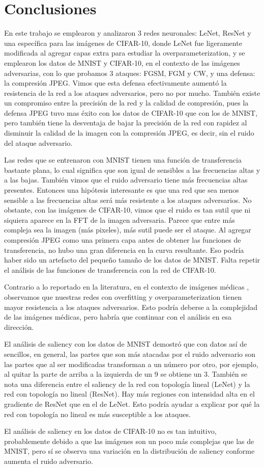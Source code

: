 \section{Conclusiones}
En este trabajo se emplearon y analizaron 3 redes neuronales: LeNet, ResNet y una específica para las imágenes de CIFAR-10, donde LeNet fue ligeramente modificada al agregar capas extra para estudiar la overparameterization, y se emplearon los datos de MNIST y CIFAR-10, en el contexto de las imágenes adversarias, con lo que probamos 3 ataques: FGSM, FGM y CW, y una defensa: la compresión JPEG. Vimos que esta defensa efectivamente aumentó la resistencia de la red a los ataques adversarios, pero no por mucho. También existe un compromiso entre la precisión de la red y la calidad de compresión, pues la defensa JPEG tuvo mas éxito con los datos de CIFAR-10 que con los de MNIST, pero también tiene la desventaja de bajar la precisión de la red con rapidez al disminuir la calidad de la imagen con la compresión JPEG, es decir, sin el ruido del ataque adversario.

Las redes que se entrenaron con MNIST tienen una función de transferencia bastante plana, lo cual significa que son igual de sensibles a las frecuencias altas y a las bajas. También vimos que el ruido adversario tiene más frecuencias altas presentes. Entonces una hipótesis interesante es que una red que sea menos sensible a las frecuencias altas será más resistente a los ataques adversarios. No obstante, con las imágenes de CIFAR-10, vimos que el ruido es tan sutil que ni siquiera aparece en la FFT de la imagen adversaria. Parece que entre más compleja sea la imagen (más pixeles), más sutil puede ser el ataque. Al agregar compresión JPEG como una primera capa antes de obtener las funciones de transferencia, no hubo una gran diferencia en la curva resultante. Eso podría haber sido un artefacto del pequeño tamaño de los datos de MNIST. Falta repetir el análisis de las funciones de transferencia con la red de CIFAR-10.

Contrario a lo reportado en la literatura, en el contexto de imágenes médicas \cite{ma2020understanding}, observamos que nuestras redes con overfitting y overparameterization tienen mayor resistencia a los ataques adversarios. Esto podría deberse a la complejidad de las imágenes médicas, pero habría que continuar con el análisis en esa dirección.

El análisis de saliency con los datos de MNIST demostró que con datos así de sencillos, en general, las partes que son más atacadas por el ruido adversario son las partes que al ser modificadas transforman a un número por otro, por ejemplo, al quitar la parte de arriba a la izquierda de un 9 se obtiene un 3. También se nota una diferencia entre el saliency de la red con topología lineal (LeNet) y la red con topología no lineal (ResNet). Hay más regiones con intensidad alta en el gradiente de ResNet que en el de LeNet. Esto podría ayudar a explicar por qué la red con topología no lineal es más susceptible a los ataques.

El análisis de saliency en los datos de CIFAR-10 no es tan intuitivo, probablemente debido a que las imágenes son un poco más complejas que las de MNIST, pero sí se observa una variación en la distribución de saliency conforme aumenta el ruido adversario.